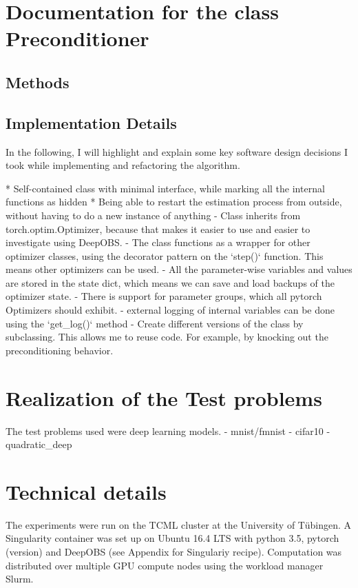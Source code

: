 \documentclass[twoside,12pt,a4paper]{report}
\begin{document}
\section{Documentation for the class Preconditioner}
\subsection{Methods}
\subsection{Implementation Details}
\begin{markdown}
In the following, I will highlight and explain some key software design decisions I took while implementing and refactoring the algorithm.

* Self-contained class with minimal interface, while marking all the internal functions as hidden
 * Being able to restart the estimation process from outside, without having to do a new instance of anything
 - Class inherits from torch.optim.Optimizer, because that makes it easier to use and easier to investigate using DeepOBS.
 - The class functions as a wrapper for other optimizer classes, using the decorator pattern on the `step()` function. This means other optimizers can be used.
 - All the parameter-wise variables and values are stored in the state dict, which means we can save and load backups of the optimizer state.
 - There is support for parameter groups, which all pytorch Optimizers should exhibit.
 - external logging of internal variables can be done using the `get_log()` method
 - Create different versions of the class by subclassing. This allows me to reuse code. For example, by knocking out the preconditioning behavior.
\end{markdown}	


\section{Realization of the Test problems}
The test problems used were deep learning models.
- mnist/fmnist
- cifar10
- quadratic\_deep

\section{Technical details}
The experiments were run on the TCML cluster at the University of Tübingen.
A Singularity container was set up on Ubuntu 16.4 LTS with python 3.5, pytorch (version) and DeepOBS (see Appendix for Singulariy recipe).
Computation was distributed over multiple GPU compute nodes using the workload manager Slurm.
\end{document}
